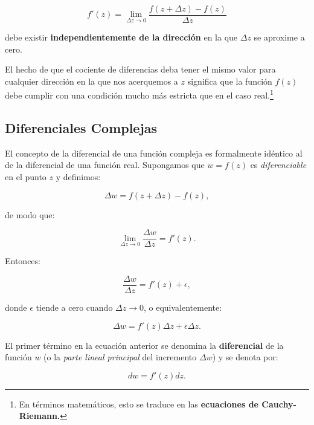 \documentclass[10pt,a4paper]{book}
\begin{document}
\begin{equation}
    f'(z) = \lim_{\Delta z \to 0} \frac{f(z + \Delta z) - f(z)}{\Delta z}
\end{equation}

debe existir \textbf{independientemente de la dirección} en la que $ \Delta z $ se aproxime a cero.  

El hecho de que el cociente de diferencias deba tener el mismo valor para cualquier dirección en la que nos acerquemos a $z$ significa que la función $f(z)$ debe cumplir con una condición mucho más estricta que en el caso real.\footnote{En términos matemáticos, esto se traduce en las \textbf{ecuaciones de Cauchy-Riemann.}}

\subsection{Diferenciales Complejas}

El concepto de la diferencial de una funci\'on compleja es formalmente id\'entico al de la diferencial de una funci\'on real. Supongamos que $ w = f(z) $ es \textit{diferenciable} en el punto $ z $ y definimos:

\begin{equation}
    \Delta w = f(z + \Delta z) - f(z),
\end{equation}

de modo que:

\begin{equation}
    \lim_{\Delta z \to 0} \frac{\Delta w}{\Delta z} = f'(z).
\end{equation}

Entonces:

\begin{equation}
    \frac{\Delta w}{\Delta z} = f'(z) + \epsilon,
\end{equation}

donde $ \epsilon $ tiende a cero cuando $ \Delta z \to 0 $, o equivalentemente:

\begin{equation}
    \Delta w = f'(z) \Delta z + \epsilon \Delta z.
\end{equation}

El primer t\'ermino en la ecuaci\'on anterior se denomina la \textbf{diferencial} de la funci\'on $ w $ (o la \textit{parte lineal principal} del incremento $ \Delta w $) y se denota por:

\begin{equation}
    dw = f'(z) dz.
\end{equation}
\end{document}
